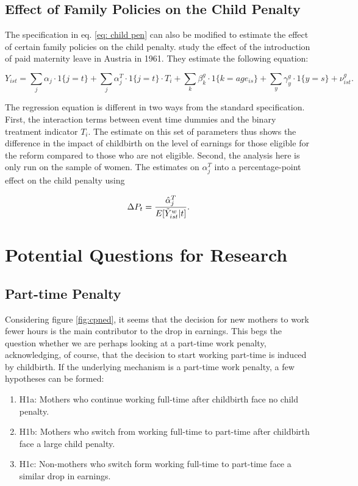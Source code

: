 \documentclass[10pt]{article}
\begin{document}
\subsection{Effect of Family Policies on the Child Penalty}
The specification in eq. \ref{eq: child pen} can also be modified to estimate the effect of certain family policies on the child penalty. \cite{kleven2020family} study the effect of the introduction of paid maternity leave in Austria in 1961. They estimate the following equation:

\begin{equation}
     Y_{ist} = \sum_{j} \alpha_j \cdot 1\{j=t\} + \sum_{j} \alpha_j^T \cdot 1\{j=t\} \cdot T_i +  \sum_k \beta^g_k \cdot 1\{k=age_{is}\} + \sum_y \gamma^g_y \cdot 1\{y=s\} + \nu^g_{ist}.
\end{equation}

The regression equation is different in two ways from the standard specification. First, the interaction terms between event time dummies and the binary treatment indicator $T_i$. The estimate on this set of parameters thus shows the difference in the impact of childbirth on the level of earnings for those eligible for the reform compared to those who are not eligible. Second, the analysis here is only run on the sample of women. The estimates on $\alpha_j^T$ into a percentage-point effect on the child penalty using

\begin{equation}
    \Delta P_t = \frac{\hat{\alpha}_j^T}{E[\Tilde{Y}^w_{ist}|t]}.
\end{equation}

\section{Potential Questions for Research}

\subsection{Part-time Penalty}
Considering figure \ref{fig:cpned}, it seems that the decision for new mothers to work fewer hours is the main contributor to the drop in earnings. This begs the question whether we are perhaps looking at a part-time work penalty, acknowledging, of course, that the decision to start working part-time is induced by childbirth. If the underlying mechanism is a part-time work penalty, a few hypotheses can be formed:

\begin{enumerate}
    \item H1a: Mothers who continue working full-time after childbirth face no child penalty.
    \item H1b: Mothers who switch from working full-time to part-time after childbirth face a large child penalty.
    \item H1c: Non-mothers who switch form working full-time to part-time face a similar drop in earnings.
\end{enumerate}
\end{document}
